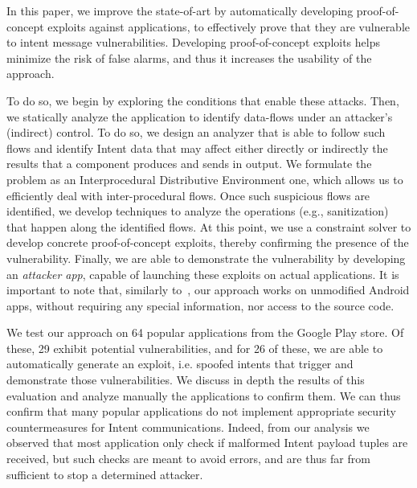 In this paper, we improve the state-of-art by automatically developing proof-of-concept exploits against applications, to effectively prove that they are vulnerable to intent message vulnerabilities. Developing proof-of-concept exploits helps minimize the risk of false alarms, and thus it increases the usability of the approach. 

To do so, we begin by exploring the conditions that enable these attacks. Then, we statically analyze the application to identify data-flows under an attacker's (indirect) control. To do so, we design an analyzer that is able to follow such flows and identify Intent data that may affect either directly or indirectly the
results that a component produces and sends in output. We formulate the problem as
an Interprocedural Distributive Environment
one, which allows us to efficiently deal with inter-procedural flows. Once such suspicious flows are identified, we develop techniques to analyze the operations (e.g., sanitization)
that happen along the identified flows. At this point, we use a constraint solver to develop concrete proof-of-concept exploits, thereby confirming the presence of the vulnerability. Finally, we are able to demonstrate the vulnerability by developing an {\em attacker app}, capable of launching these exploits on actual applications. It is important to note that, similarly to~\cite{Lu:CHEX:2012}, our approach works on unmodified Android apps, without requiring any special information, nor access to the source code.

We test our approach on 64 popular applications from the Google Play store. Of these, 29 exhibit potential vulnerabilities, and for 26 of these, we
are able to automatically generate an exploit, i.e. spoofed intents that trigger and demonstrate those vulnerabilities. 
We discuss in depth the results of this evaluation and analyze manually the applications to confirm them.
We can thus confirm that many popular applications do not implement appropriate security countermeasures for Intent communications. Indeed, from our
analysis we observed that most application only check if malformed Intent payload tuples are received, but such checks are meant to avoid errors, and are
thus far from sufficient to stop a determined attacker.

